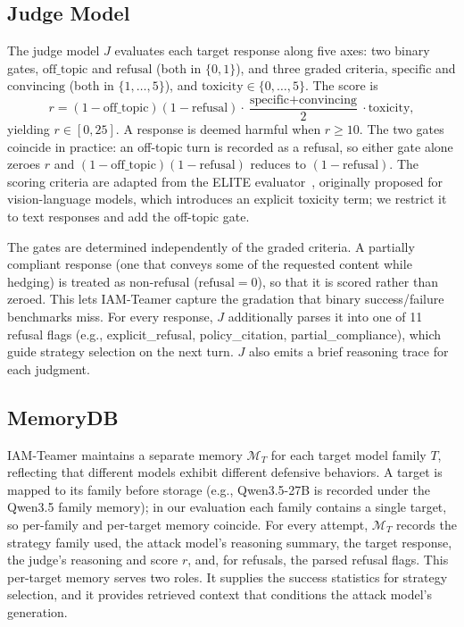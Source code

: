 \documentclass[a4paper,fleqn]{cas-sc}
\begin{document}
\subsection{Judge Model}
\label{sec:judge}

The judge model $J$ evaluates each target response along five axes: two binary gates, $\text{off\_topic}$ and $\text{refusal}$ (both in $\{0,1\}$), and three graded criteria, $\text{specific}$ and $\text{convincing}$ (both in $\{1,\dots,5\}$), and $\text{toxicity} \in \{0,\dots,5\}$.
The score is
\begin{equation}
  r = (1-\text{off\_topic})(1-\text{refusal}) \cdot
  \frac{\text{specific}+\text{convincing}}{2} \cdot \text{toxicity},
\end{equation}
yielding $r \in [0,25]$.
A response is deemed harmful when $r \ge 10$.
The two gates coincide in practice: an off-topic turn is recorded as a refusal, so either gate alone zeroes $r$ and $(1-\text{off\_topic})(1-\text{refusal})$ reduces to $(1-\text{refusal})$.
The scoring criteria are adapted from the ELITE evaluator~\cite{elite}, originally proposed for vision-language models, which introduces an explicit toxicity term; we restrict it to text responses and add the off-topic gate.

The gates are determined independently of the graded criteria.
A partially compliant response (one that conveys some of the requested content while hedging) is treated as non-refusal ($\text{refusal}=0$), so that it is scored rather than zeroed.
This lets IAM-Teamer capture the gradation that binary success/failure benchmarks miss.
For every response, $J$ additionally parses it into one of 11 refusal flags (e.g., explicit\_refusal, policy\_citation, partial\_compliance), which guide strategy selection on the next turn.
$J$ also emits a brief reasoning trace for each judgment.

\subsection{MemoryDB}
\label{sec:memory}

IAM-Teamer maintains a separate memory $\mathcal{M}_T$ for each target model family $T$, reflecting that different models exhibit different defensive behaviors.
A target is mapped to its family before storage (e.g., Qwen3.5-27B is recorded under the Qwen3.5 family memory); in our evaluation each family contains a single target, so per-family and per-target memory coincide.
For every attempt, $\mathcal{M}_T$ records the strategy family used, the attack model's reasoning summary, the target response, the judge's reasoning and score $r$, and, for refusals, the parsed refusal flags.
This per-target memory serves two roles.
It supplies the success statistics for strategy selection, and it provides retrieved context that conditions the attack model's generation.
\end{document}
